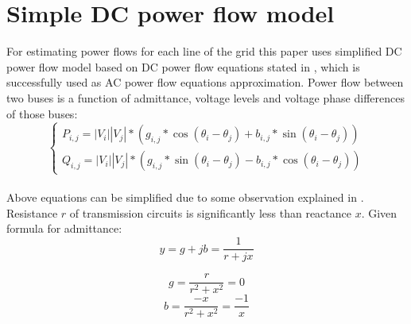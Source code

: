 \documentclass[twoside]{iisthesis}
\begin{document}
\section{Simple DC power flow model}
For estimating power flows for each line of the grid this paper uses simplified DC power flow model based on DC power flow equations stated in \cite{Graigner1994}, which is successfully used  as AC power flow equations approximation. Power flow between two buses is a function of admittance, voltage levels and voltage phase differences  of those buses:
\begin{equation}\label{eq:power}
	\begin{cases}
	P_{i,j}=|V_i||V_j|*(g_{i,j}*\cos(\theta_i - \theta_j) + b_{i,j}*\sin(\theta_i - \theta_j)) \\
	Q_{i,j}=|V_i||V_j|*(g_{i,j}*\sin(\theta_i - \theta_j) - b_{i,j}*\cos(\theta_i - \theta_j))
	\end{cases}
\end{equation}
\\
Above equations can be simplified due to some observation explained in \cite{Graigner1994}.\\
Resistance \(r\) of transmission circuits is significantly less than reactance \(x\). Given formula for admittance:
\begin{equation}
	y = g +jb = \dfrac{1}{r + jx} 
\end{equation} 

\[g = \dfrac{r}{r^2 +x^2} = 0\]
\[b = \dfrac{-x}{r^2 + x^2} = \dfrac{-1}{x}\]
\end{document}
